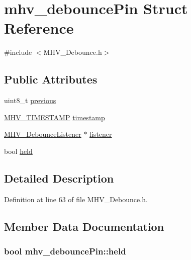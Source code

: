 \hypertarget{structmhv__debounce_pin}{\section{mhv\-\_\-debounce\-Pin Struct Reference}
\label{structmhv__debounce_pin}
}


{\ttfamily \#include $<$M\-H\-V\-\_\-\-Debounce.\-h$>$}

\subsection*{Public Attributes}
\begin{DoxyCompactItemize}
\item 
uint8\-\_\-t \hyperlink{structmhv__debounce_pin_ac811cadb60a02f9b98876e62bb8df8fc}{previous}
\item 
\hyperlink{_m_h_v___r_t_c_8h_a1e30d3a92b1b868286bd0d619245d8a6}{M\-H\-V\-\_\-\-T\-I\-M\-E\-S\-T\-A\-M\-P} \hyperlink{structmhv__debounce_pin_a0d8a978d0e2cb1677e30b174986583f2}{timestamp}
\item 
\hyperlink{class_m_h_v___debounce_listener}{M\-H\-V\-\_\-\-Debounce\-Listener} $\ast$ \hyperlink{structmhv__debounce_pin_aa7c133ca2e2edc8c1df591ef842432b9}{listener}
\item 
bool \hyperlink{structmhv__debounce_pin_a27f3b74fb30ca3bb8aa684d06ae58d16}{held}
\end{DoxyCompactItemize}


\subsection{Detailed Description}


Definition at line 63 of file M\-H\-V\-\_\-\-Debounce.\-h.



\subsection{Member Data Documentation}
\hypertarget{structmhv__debounce_pin_a27f3b74fb30ca3bb8aa684d06ae58d16}{
\subsubsection[{held}]{\setlength{\rightskip}{0pt plus 5cm}bool mhv\-\_\-debounce\-Pin\-::held}}\label{structmhv__debounce_pin_a27f3b74fb30ca3bb8aa684d06ae58d16}


